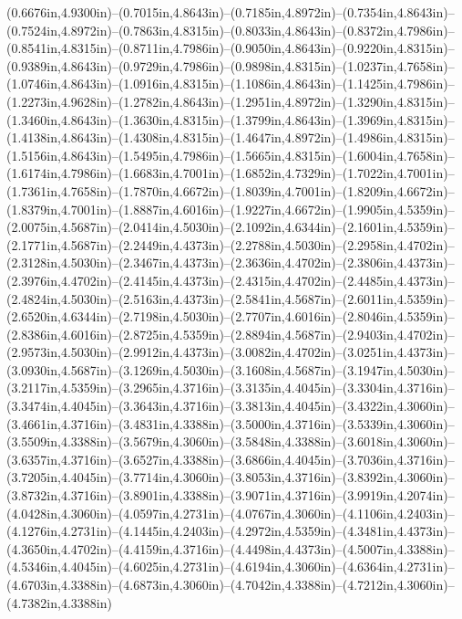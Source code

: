 (0.6676in,4.9300in)--(0.7015in,4.8643in)--(0.7185in,4.8972in)--(0.7354in,4.8643in)--(0.7524in,4.8972in)--(0.7863in,4.8315in)--(0.8033in,4.8643in)--(0.8372in,4.7986in)--(0.8541in,4.8315in)--(0.8711in,4.7986in)--(0.9050in,4.8643in)--(0.9220in,4.8315in)--(0.9389in,4.8643in)--(0.9729in,4.7986in)--(0.9898in,4.8315in)--(1.0237in,4.7658in)--(1.0746in,4.8643in)--(1.0916in,4.8315in)--(1.1086in,4.8643in)--(1.1425in,4.7986in)--(1.2273in,4.9628in)--(1.2782in,4.8643in)--(1.2951in,4.8972in)--(1.3290in,4.8315in)--(1.3460in,4.8643in)--(1.3630in,4.8315in)--(1.3799in,4.8643in)--(1.3969in,4.8315in)--(1.4138in,4.8643in)--(1.4308in,4.8315in)--(1.4647in,4.8972in)--(1.4986in,4.8315in)--(1.5156in,4.8643in)--(1.5495in,4.7986in)--(1.5665in,4.8315in)--(1.6004in,4.7658in)--(1.6174in,4.7986in)--(1.6683in,4.7001in)--(1.6852in,4.7329in)--(1.7022in,4.7001in)--(1.7361in,4.7658in)--(1.7870in,4.6672in)--(1.8039in,4.7001in)--(1.8209in,4.6672in)--(1.8379in,4.7001in)--(1.8887in,4.6016in)--(1.9227in,4.6672in)--(1.9905in,4.5359in)--(2.0075in,4.5687in)--(2.0414in,4.5030in)--(2.1092in,4.6344in)--(2.1601in,4.5359in)--(2.1771in,4.5687in)--(2.2449in,4.4373in)--(2.2788in,4.5030in)--(2.2958in,4.4702in)--(2.3128in,4.5030in)--(2.3467in,4.4373in)--(2.3636in,4.4702in)--(2.3806in,4.4373in)--(2.3976in,4.4702in)--(2.4145in,4.4373in)--(2.4315in,4.4702in)--(2.4485in,4.4373in)--(2.4824in,4.5030in)--(2.5163in,4.4373in)--(2.5841in,4.5687in)--(2.6011in,4.5359in)--(2.6520in,4.6344in)--(2.7198in,4.5030in)--(2.7707in,4.6016in)--(2.8046in,4.5359in)--(2.8386in,4.6016in)--(2.8725in,4.5359in)--(2.8894in,4.5687in)--(2.9403in,4.4702in)--(2.9573in,4.5030in)--(2.9912in,4.4373in)--(3.0082in,4.4702in)--(3.0251in,4.4373in)--(3.0930in,4.5687in)--(3.1269in,4.5030in)--(3.1608in,4.5687in)--(3.1947in,4.5030in)--(3.2117in,4.5359in)--(3.2965in,4.3716in)--(3.3135in,4.4045in)--(3.3304in,4.3716in)--(3.3474in,4.4045in)--(3.3643in,4.3716in)--(3.3813in,4.4045in)--(3.4322in,4.3060in)--(3.4661in,4.3716in)--(3.4831in,4.3388in)--(3.5000in,4.3716in)--(3.5339in,4.3060in)--(3.5509in,4.3388in)--(3.5679in,4.3060in)--(3.5848in,4.3388in)--(3.6018in,4.3060in)--(3.6357in,4.3716in)--(3.6527in,4.3388in)--(3.6866in,4.4045in)--(3.7036in,4.3716in)--(3.7205in,4.4045in)--(3.7714in,4.3060in)--(3.8053in,4.3716in)--(3.8392in,4.3060in)--(3.8732in,4.3716in)--(3.8901in,4.3388in)--(3.9071in,4.3716in)--(3.9919in,4.2074in)--(4.0428in,4.3060in)--(4.0597in,4.2731in)--(4.0767in,4.3060in)--(4.1106in,4.2403in)--(4.1276in,4.2731in)--(4.1445in,4.2403in)--(4.2972in,4.5359in)--(4.3481in,4.4373in)--(4.3650in,4.4702in)--(4.4159in,4.3716in)--(4.4498in,4.4373in)--(4.5007in,4.3388in)--(4.5346in,4.4045in)--(4.6025in,4.2731in)--(4.6194in,4.3060in)--(4.6364in,4.2731in)--(4.6703in,4.3388in)--(4.6873in,4.3060in)--(4.7042in,4.3388in)--(4.7212in,4.3060in)--(4.7382in,4.3388in)
